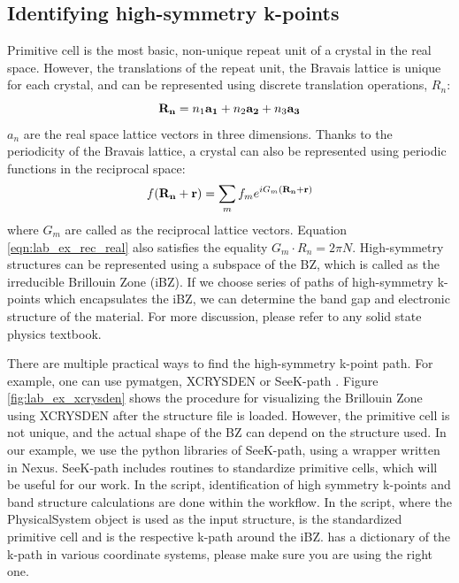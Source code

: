 \subsection{Identifying high-symmetry k-points}\label{sec:lab_ex_highk}
Primitive cell is the most basic, non-unique repeat unit of a crystal in the real space. 
However, the translations of the repeat unit, the Bravais lattice is unique for each crystal, and can be represented using discrete translation operations, $R_n$:
\begin{equation}
{\bf R_n} = n_1{\bf a_1} + n_2{\bf a_2} + n_3{\bf a_3}
\end{equation}
$a_n$ are the real space lattice vectors in three dimensions. Thanks to the periodicity of the Bravais lattice, a crystal can also be represented using periodic functions in the reciprocal space:
\begin{equation}
f({\bf R_n + r})= \sum_{m}f_me^{iG_m({\bf R_n+r})}\label{eqn:lab_ex_rec_real}
\end{equation}
where $G_m$ are called as the reciprocal lattice vectors. Equation \ref{eqn:lab_ex_rec_real} also satisfies the equality $G_m\cdot{R_n}=2{\pi}N$. High-symmetry structures can be represented using a subspace of the BZ, which is called as the irreducible Brillouin Zone (iBZ). If we choose series of  paths of high-symmetry k-points which encapsulates the iBZ, we can determine the band gap and electronic structure of the material. For more discussion, please refer to any solid state physics textbook. 

There are multiple practical ways to find the high-symmetry k-point path. 
For example, one can use pymatgen, \cite{Ong2013} XCRYSDEN \cite{Kokalj1999} or SeeK-path \cite{Hinuma2017}. 
Figure \ref{fig:lab_ex_xcrysden} shows the procedure for visualizing the Brillouin Zone using XCRYSDEN after the structure file is loaded. 
However, the primitive cell is not unique, and the actual shape of the BZ can depend on the structure used. 
In our example, we use the python libraries of SeeK-path, using a wrapper written in Nexus. 
SeeK-path includes routines to standardize primitive cells, which will be useful for our work. 
In the  script, identification of high symmetry k-points and band structure calculations are done within the workflow. 
In the script, where the  PhysicalSystem object is used as the input structure,  is the standardized primitive cell and  is the respective k-path around the iBZ. 
 has a dictionary of the k-path in various coordinate systems, please make sure you are using the right one. 

